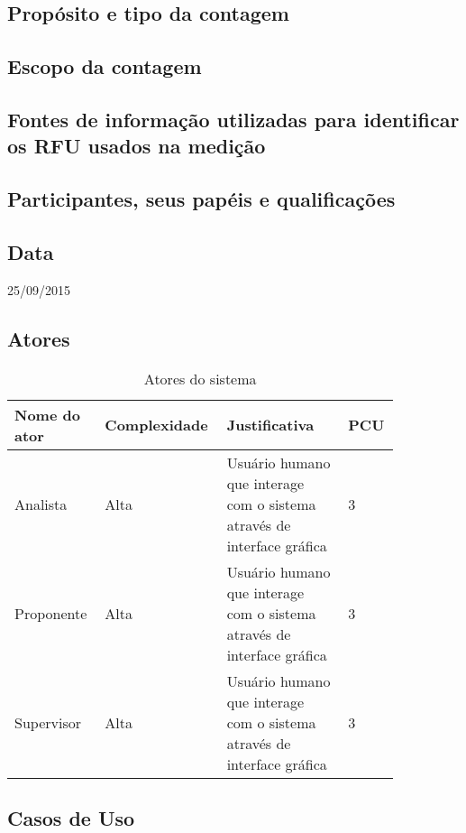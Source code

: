 \subsection{Propósito e tipo da contagem}

\subsection{Escopo da contagem}

\subsection{Fontes de informação utilizadas para identificar os RFU usados na medição}
 
\subsection{Participantes, seus papéis e qualificações}

\subsection{Data}
25/09/2015

\subsection{Atores}

\begin{table*}[!h]
\centering
\caption{Atores do sistema}
\label{Rotulo}
  \begin{tabular}{|p{0.20\linewidth}|p{0.25\linewidth}|p{0.30\linewidth}|p{0.10\linewidth}|}
  \hline
  \textbf{Nome do ator} & \textbf{Complexidade} & \textbf{Justificativa} & \textbf{PCU} \\ 
  \hline

  Analista & Alta & Usuário humano que interage com o sistema através de interface gráfica & 3 \\
  \hline
  Proponente & Alta & Usuário humano que interage com o sistema através de interface gráfica & 3\\
  \hline
  Supervisor & Alta & Usuário humano que interage com o sistema através de interface gráfica & 3\\
  \hline
  \end{tabular}
\end{table*}


\subsection{Casos de Uso}

